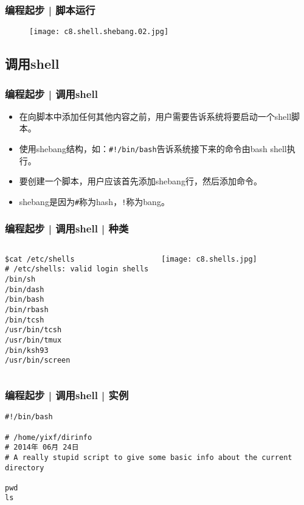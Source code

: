\begin{frame}
  \frametitle{编程起步 | 脚本运行}
  \begin{figure}
    \centering
    \texttt{[image: c8.shell.shebang.02.jpg]}
  \end{figure}
\end{frame}

\subsection{调用shell}
\begin{frame}[fragile]
  \frametitle{编程起步 | \alert{调用shell}}
  \begin{itemize}
    \item 在向脚本中添加任何其他内容之前，用户需要告诉系统将要启动一个shell脚本。
    \item 使用shebang结构，如：\verb|#!/bin/bash|告诉系统接下来的命令由bash shell执行。
    \item 要创建一个脚本，用户应该首先添加shebang行，然后添加命令。
    \item shebang是因为\verb|#|称为hash，\verb|!|称为bang。
  \end{itemize}
\end{frame}

\begin{frame}[fragile]
  \frametitle{编程起步 | 调用shell | 种类}
  \begin{columns}
\begin{lstlisting}
$cat /etc/shells
# /etc/shells: valid login shells
/bin/sh
/bin/dash
/bin/bash
/bin/rbash
/bin/tcsh
/usr/bin/tcsh
/usr/bin/tmux
/bin/ksh93
/usr/bin/screen
\end{lstlisting}
    \texttt{[image: c8.shells.jpg]}
  \end{columns}
\end{frame}

\begin{frame}[fragile]
  \frametitle{编程起步 | 调用shell | 实例}
\begin{lstlisting}
#!/bin/bash

# /home/yixf/dirinfo
# 2014年 06月 24日
# A really stupid script to give some basic info about the current directory

pwd
ls
\end{lstlisting}
\end{frame}

